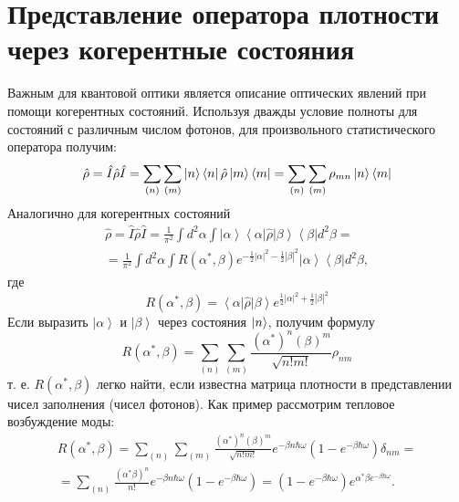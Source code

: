 \section{Представление оператора плотности через когерентные
  состояния}
Важным для квантовой оптики является описание оптических явлений при
помощи когерентных состояний. Используя дважды условие полноты для  
состояний с различным числом фотонов, для произвольного
статистического оператора получим: 
\[
\hat{\rho} = \hat{I}\hat{\rho}\hat{I} = 
\sum_{(n)}\sum_{(m)}
\ket{n}\bra{n}\hat{\rho}\ket{m}\bra{m} = 
\sum_{(n)}\sum_{(m)} \rho_{mn}\ket{n}\bra{m}
\]
Аналогично для когерентных состояний
\begin{eqnarray}
\hat{\rho} = \hat{I}\hat{\rho}\hat{I} = 
\frac{1}{\pi^2}\int d^2\alpha\int
\left|\alpha\right>\left<\alpha\right|\hat{\rho}\left|\beta\right>\left<\beta\right|
d^2 \beta = 
\nonumber \\
= \frac{1}{\pi^2} \int d^2\alpha \int
R\left(\alpha^{*}, \beta\right) e^{-\frac{1}{2}\left|\alpha\right|^2 -\frac{1}{2}\left|\beta\right|^2}
\left|\alpha\right>\left<\beta\right|d^2 \beta ,
\end{eqnarray}
где
\[
R\left(\alpha^{*}, \beta\right) =
\left<\alpha\right|\hat{\rho}\left|\beta\right>
e^{\frac{1}{2}\left|\alpha\right|^2 +\frac{1}{2}\left|\beta\right|^2}
\]
Если выразить $\left|\alpha\right>$ и $\left|\beta\right>$ через
состояния $\ket{n}$,  получим формулу 
\begin{equation}
R\left(\alpha^{*}, \beta\right) = \sum_{(n)}\sum_{(m)}
\frac{\left(\alpha^{*}\right)^n \left(\beta\right)^m}{\sqrt{n!m!}}\rho_{nm}
\end{equation}
т. е. $R\left(\alpha^{*}, \beta\right)$ легко найти, если известна
матрица плотности 
в представлении чисел заполнения (чисел
фотонов). Как пример рассмотрим тепловое возбуждение моды: 
\begin{eqnarray}
R\left(\alpha^{*}, \beta\right) = \sum_{(n)}\sum_{(m)}
\frac{\left(\alpha^{*}\right)^n \left(\beta\right)^m}{\sqrt{n!m!}}
e^{-\beta n \hbar \omega}\left(1  -  e^{-\beta \hbar \omega}\right)
\delta_{nm} = 
\nonumber \\
= \sum_{(n)}\frac{\left(\alpha^{*} \beta\right)^n }{n!}
e^{-\beta n \hbar \omega}\left(1  -  e^{-\beta \hbar \omega}\right) =
\left(1  -  e^{-\beta \hbar \omega}\right) e^{\alpha^{*}\beta
  e^{-\beta \hbar \omega}}.
\end{eqnarray}

